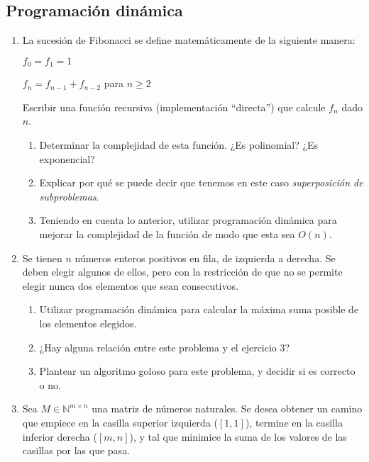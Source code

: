 \documentclass{article}
\begin{document}
\subsection*{Programación dinámica}

    \begin{enumerate}[resume]
        \item La sucesión de Fibonacci se define matemáticamente de la siguiente manera:
                 
                 $f_0 = f_1 = 1$
                 
                 $f_n = f_{n-1} + f_{n-2}$ para $n \geq 2$
        
                   Escribir una función recursiva (implementación ``directa'') que calcule $f_n$ dado $n$.
                      \begin{enumerate}
                           \item Determinar la complejidad de esta función. ¿Es polinomial? ¿Es exponencial?
                           \item Explicar por qué se puede decir que tenemos en este caso \textit{superposición de subproblemas}.
                           \item Teniendo en cuenta lo anterior, utilizar programación dinámica para mejorar la complejidad de la función de modo que esta sea $O(n)$.
                      \end{enumerate}
        \item Se tienen $n$ números enteros positivos en fila, de izquierda a derecha. Se deben elegir algunos de ellos, pero con la restricción de que no se permite elegir nunca dos elementos que sean consecutivos.
                \begin{enumerate}
                    \item Utilizar programación dinámica para calcular la máxima suma posible de los elementos elegidos. 
                    \item ¿Hay alguna relación entre este problema y el ejercicio 3?
                    \item Plantear un algoritmo goloso para este problema, y decidir si es correcto o no.
                \end{enumerate}
        \item Sea $M \in \mathbb{N}^{m \times n}$ una matriz de números naturales. Se desea obtener un camino que empiece en la casilla superior izquierda
               ($[1,1]$), termine en la casilla inferior derecha ($[m,n]$), y tal que minimice la suma de los valores de las casillas por las que pasa.
            

\end{enumerate}
\end{document}
